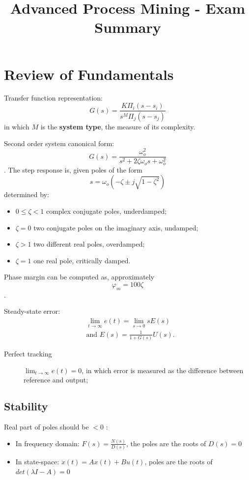 \documentclass[a4paper]{report}
\title{Advanced Process Mining - Exam Summary}
\begin{document}
\section*{Review of Fundamentals}

Transfer function representation: \[
    G(s) = \frac{K \Pi_i \left( s-s_i \right) }{s^{M}\Pi_j \left( s-s_j \right) }
\] in which $M$ is the \textbf{system type}, the measure of its complexity.

Second order system canonical form: \[
    G(s) = \frac{\omega^{2}_o}{s^{2} + 2\zeta\omega_o s + \omega^{2}_o}
\]. The step response is, given poles of the form \[
s = \omega_o\left( -\zeta \pm j\sqrt{1-\zeta^{2}}  \right) 
\] determined by:
\begin{itemize}
    \item $0\le \zeta < 1$ complex conjugate poles, underdamped;
    \item $\zeta = 0$ two conjugate poles on the imaginary axis, undamped;
    \item $\zeta > 1$ two different real poles, overdamped;
     \item $\zeta = 1$ one real pole, critically damped.
\end{itemize}

Phase margin can be computed as, approximately  \[
\varphi_m = 100\zeta
\].

Steady-state error:
\begin{align*}
    &\lim_{t \to \infty} e(t) = \lim_{s \to 0} sE(s) \\
    & \text{and } E(s) = \frac{1}{1+G(s)}U(s) 
.\end{align*}

\begin{description}
    \item[Perfect tracking] $\lim_{t \to \infty} e(t) = 0$, in which error is measured as the difference between reference and output;
\end{description}

\subsection*{Stability}

Real part of poles should be $<0$ :
\begin{itemize}
    \item In frequency domain: $F(s) = \frac{N(s)}{D(s)}$, the poles are the roots of $D(s) = 0$
    \item In state-space: $\dot{x}(t) = Ax(t) + Bu(t)$, poles are the roots of $det(\lambda I - A) = 0$
\end{itemize}
\end{document}

